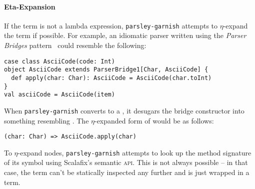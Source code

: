 \documentclass[../../main.tex]{subfiles}
\begin{document}
\paragraph{Eta-Expansion}
If the term is not a lambda expression, \texttt{parsley-garnish} attempts to $\eta$-expand the term if possible.
For example, an idiomatic parser written using the \emph{Parser Bridges} pattern~\cite{willis_design_2022} could resemble the following:
\begin{verbatim}
case class AsciiCode(code: Int)
object AsciiCode extends ParserBridge1[Char, AsciiCode] {
  def apply(char: Char): AsciiCode = AsciiCode(char.toInt)
}
val asciiCode = AsciiCode(item)
\end{verbatim}
%
When \texttt{parsley-garnish} converts  to a , it desugars the bridge constructor into something resembling .
The $\eta$-expanded form of  would be as follows:
\begin{verbatim}
(char: Char) => AsciiCode.apply(char)
\end{verbatim}
%
To $\eta$-expand  nodes, \texttt{parsley-garnish} attempts to look up the method signature of its symbol using Scalafix's semantic \textsc{api}.
This is not always possible -- in that case, the term can't be statically inspected any further and is just wrapped in a  term.
\end{document}
